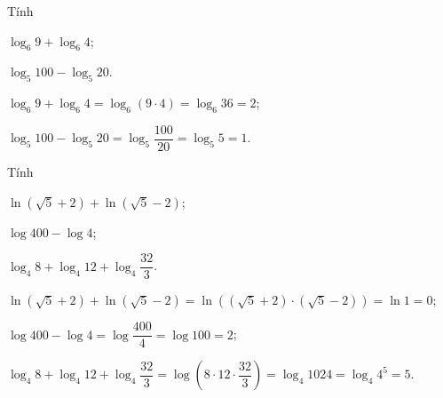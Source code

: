 \begin{bt}%

	Tính
	\begin{listEX}[2]
		\item  $\log _{6} 9+\log _{6} 4$;
		\item $\log _{5} 100-\log _{5} 20$.
	\end{listEX}
	\loigiai
	{\begin{listEX}[1]
			\item $\log _{6} 9+\log _{6} 4=\log _{6}(9\cdot 4)=\log _{6} 36=2$;
			\item $\log _{5} 100-\log _{5} 20=\log _{5} \dfrac{100}{20}=\log _{5} 5=1$.
		\end{listEX}
	}
\end{bt}

\begin{bt}%

	Tính
	\begin{listEX}[2]
		\item  $\ln \left(\sqrt{5}+2\right)+\ln \left(\sqrt{5}-2\right)$;
		\item $\log 400-\log 4$;
		\item $\log _{4} 8+\log _{4} 12+\log _{4} \dfrac{32}{3}$.
	\end{listEX}
	\loigiai
	{\begin{listEX}[1]
			\item $\ln \left(\sqrt{5}+2\right)+\ln \left(\sqrt{5}-2\right)=\ln \left(\left(\sqrt{5}+2\right)\cdot \left(\sqrt{5}-2\right)\right)=\ln 1=0$;
			\item $\log 400-\log 4=\log\dfrac{400}{4}=\log 100=2$;
			\item $\log _{4} 8+\log _{4} 12+\log _{4} \dfrac{32}{3}=\log \left(8\cdot 12\cdot \dfrac{32}{3}\right)=\log_4 1024=\log_4 4^5=5$.
		\end{listEX}
	}
\end{bt}

